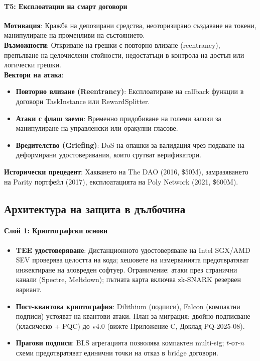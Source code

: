 \documentclass[11pt]{article}
\begin{document}
\paragraph{T5: Експлоатации на смарт договори}
\textbf{Мотивация}: Кражба на депозирани средства, неоторизирано създаване на токени, манипулиране на променливи на състоянието.\\
\textbf{Възможности}: Откриване на грешки с повторно влизане (reentrancy), препълване на целочислени стойности, недостатъци в контрола на достъп или логически грешки.\\
\textbf{Вектори на атака}:
\begin{itemize}[noitemsep]
  \item \textbf{Повторно влизане (Reentrancy)}: Експлоатиране на callback функции в договори TaskInstance или RewardSplitter.
  \item \textbf{Атаки с флаш заеми}: Временно придобиване на големи залози за манипулиране на управленски или оракулни гласове.
  \item \textbf{Вредителство (Griefing)}: DoS на опашки за валидация чрез подаване на деформирани удостоверявания, които срутват верификатори.
\end{itemize}
\textbf{Исторически прецедент}: Хакването на The DAO (2016, \$50M), замразяването на Parity портфейл (2017), експлоатацията на Poly Network (2021, \$600M).

\subsection{Архитектура на защита в дълбочина}

\paragraph{Слой 1: Криптографски основи}
\begin{itemize}[noitemsep]
  \item \textbf{TEE удостоверяване}: Дистанционното удостоверяване на Intel SGX/AMD SEV проверява целостта на кода; хешовете на измерванията предотвратяват инжектиране на зловреден софтуер. Ограничение: атаки през странични канали (Spectre, Meltdown); пътната карта включва zk-SNARK резервен вариант.
  \item \textbf{Пост-квантова криптография}: Dilithium (подписи), Falcon (компактни подписи) устояват на квантови атаки. План за миграция: двойно подписване (класическо + PQC) до v4.0 (вижте Приложение C, Доклад PQ-2025-08).
  \item \textbf{Прагови подписи}: BLS агрегацията позволява компактен multi-sig; $t$-от-$n$ схеми предотвратяват единични точки на отказ в bridge договори.
\end{itemize}
\end{document}
